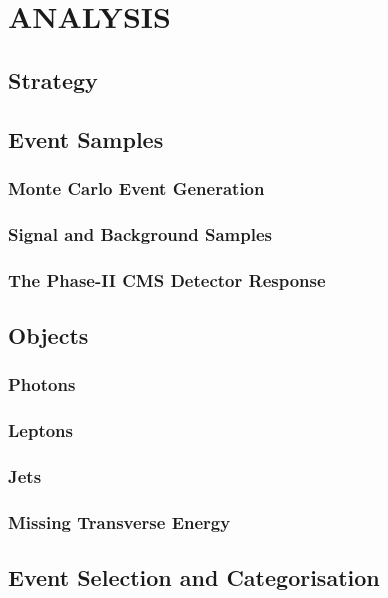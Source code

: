 \chapter{ANALYSIS}\label{ch3}

\section{Strategy}

\section{Event Samples}

\subsection{Monte Carlo Event Generation}

\subsection{Signal and Background Samples}

\subsection{The Phase-II CMS Detector Response}

\section{Objects}

\subsection{Photons}

\subsection{Leptons}

\subsection{Jets}

\subsection{Missing Transverse Energy}

\section{Event Selection and Categorisation}

